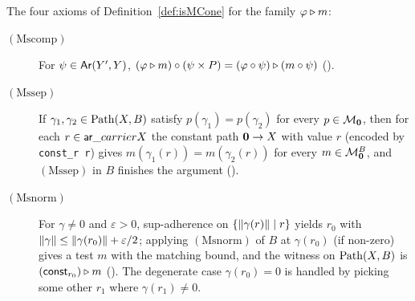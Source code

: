 \begin{remark}
  The four axioms of Definition~\ref{def:isMCone} for the family
  $\varphi \mathbin{\triangleright} m$:
  \begin{description}
    \item[$(\mathrm{Mscomp})$] For
      $\psi \in \mathsf{Ar}(Y', Y)$,
      $(\varphi \mathbin{\triangleright} m) \circ (\psi \times P)
        = (\varphi \circ \psi) \mathbin{\triangleright} (m \circ \psi)$
      ().
    \item[$(\mathrm{Mssep})$] If $\gamma_1, \gamma_2 \in \mathrm{Path}(X, B)$
      satisfy $p(\gamma_1) = p(\gamma_2)$ for every
      $p \in \mathcal{M}_{\mathbf{0}}$, then for each $r \in \mathsf{ar}\_carrier X$
      the constant path $\mathbf{0} \to X$ with value $r$ (encoded by
      \texttt{const\_r r}) gives
      $m(\gamma_1(r)) = m(\gamma_2(r))$ for every
      $m \in \mathcal{M}_{\mathbf{0}}^B$, and $(\mathrm{Mssep})$ in $B$
      finishes the argument
      ().
    \item[$(\mathrm{Msnorm})$] For $\gamma \ne 0$ and
      $\varepsilon > 0$, sup-adherence on
      $\{\lVert \gamma(r) \rVert \mid r\}$ yields $r_0$ with
      $\lVert \gamma \rVert \le \lVert \gamma(r_0) \rVert + \varepsilon/2$;
      applying $(\mathrm{Msnorm})$ of $B$ at $\gamma(r_0)$ (if
      non-zero) gives a test $m$ with the matching bound, and the
      witness on $\mathrm{Path}(X, B)$ is
      $(\textsf{const}_{r_0}) \mathbin{\triangleright} m$
      (). The degenerate
      case $\gamma(r_0) = 0$ is handled by picking some other $r_1$
      where $\gamma(r_1) \ne 0$.
  \end{description}
\end{remark}


